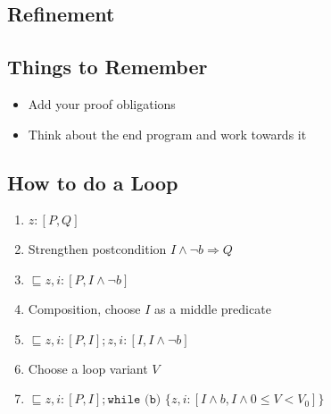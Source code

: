 \documentclass[landscape]{cheat}
\begin{document}
\begin{multicols*}{3}
\section{Refinement}

\subsection{Things to Remember}
\begin{itemize}
    \item Add your proof obligations
    \item Think about the end program and work towards it
\end{itemize}
\subsection{How to do a Loop}
\begin{enumerate}
    \item $z: [P, Q]$
    \item Strengthen postcondition $I \land \lnot b \Rightarrow Q$
    \item $\sqsubseteq z, i: [P, I \land \lnot b]$
    \item Composition, choose $I$ as a middle predicate
    \item $\sqsubseteq z, i: [P, I]; z, i: [I, I \land \lnot b]$
    \item Choose a loop variant $V$
    \item $\sqsubseteq z, i: [P, I]; \texttt{while (b) \{} z, i: [I \land b, I \land 0 \leq V < V_0]\texttt{\}}$
\end{enumerate}


\end{multicols*}
\end{document}
